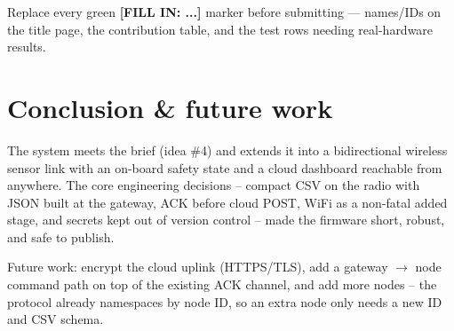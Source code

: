 \documentclass[11pt,a4paper]{article}
\newcommand{\ok}[1]{\par\medskip\noindent\colorbox{okbg}{\parbox{\dimexpr\linewidth-2\fboxsep}{\small\color{okfg}#1}}\medskip\par}
\begin{document}
\ok{Replace every green \textbf{[FILL IN: ...]} marker before submitting
--- names/IDs on the title page, the contribution table, and the
test rows needing real-hardware results.}

\section{Conclusion \& future work}

The system meets the brief (idea \#4) and extends it into a
bidirectional wireless sensor link with an on-board safety state and a
cloud dashboard reachable from anywhere. The core engineering decisions
-- compact CSV on the radio with JSON built at the gateway, ACK before
cloud POST, WiFi as a non-fatal added stage, and secrets kept out of
version control -- made the firmware short, robust, and safe to publish.

Future work: encrypt the cloud uplink (HTTPS/TLS), add a gateway
$\rightarrow$ node command path on top of the existing ACK channel, and
add more nodes -- the protocol already namespaces by node ID, so an
extra node only needs a new ID and CSV schema.
\end{document}
